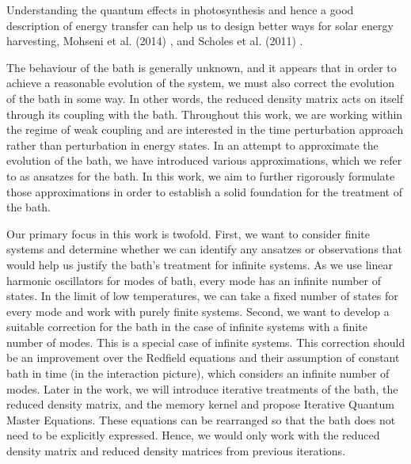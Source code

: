 Understanding the quantum effects in photosynthesis and hence a good description of energy transfer can help us to design better ways for solar energy harvesting, Mohseni et al. (2014) \cite{mohseni_quantum_2014}, and Scholes et al. (2011) \cite{scholes_lessons_2011}.

The behaviour of the bath is generally unknown, and it appears that in order to achieve a reasonable evolution of the system, we must also correct the evolution of the bath in some way. In other words, the reduced density matrix acts on itself through its coupling with the bath. Throughout this work, we are working within the regime of weak coupling and are interested in the time perturbation approach rather than perturbation in energy states. In an attempt to approximate the evolution of the bath, we have introduced various approximations, which we refer to as ansatzes for the bath. In this work, we aim to further rigorously formulate those approximations in order to establish a solid foundation for the treatment of the bath.

Our primary focus in this work is twofold. First, we want to consider finite systems and determine whether we can identify any ansatzes or observations that would help us justify the bath's treatment for infinite systems. As we use linear harmonic oscillators for modes of bath, every mode has an infinite number of states. In the limit of low temperatures, we can take a fixed number of states for every mode and work with purely finite systems. Second, we want to develop a suitable correction for the bath in the case of infinite systems with a finite number of modes. This is a special case of infinite systems. This correction should be an improvement over the Redfield equations and their assumption of constant bath in time (in the interaction picture), which considers an infinite number of modes. Later in the work, we will introduce iterative treatments of the bath, the reduced density matrix, and the memory kernel and propose Iterative Quantum Master Equations. These equations can be rearranged so that the bath does not need to be explicitly expressed. Hence, we would only work with the reduced density matrix and reduced density matrices from previous iterations.

